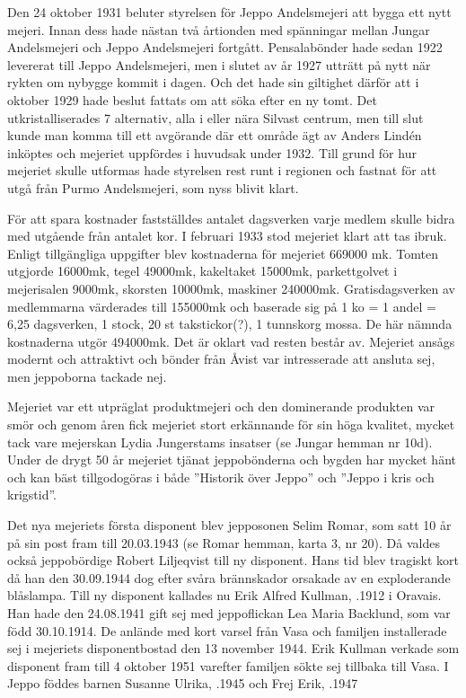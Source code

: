 
Den 24 oktober 1931 beluter styrelsen för Jeppo Andelsmejeri att bygga ett nytt mejeri. Innan dess hade nästan två årtionden med spänningar mellan Jungar Andelsmejeri och Jeppo Andelsmejeri fortgått. Pensalabönder hade sedan 1922 levererat till Jeppo Andelsmejeri, men i slutet av år 1927 utträtt på nytt när rykten om nybygge kommit i dagen. Och det hade sin giltighet därför att i oktober 1929 hade beslut fattats om att söka efter en ny tomt. Det utkristalliserades 7 alternativ, alla i eller nära Silvast centrum, men till slut kunde man komma till ett avgörande där ett område ägt av Anders Lindén inköptes och mejeriet uppfördes i huvudsak under 1932. Till grund för hur mejeriet skulle utformas hade styrelsen rest runt i regionen och fastnat för att utgå från Purmo Andelsmejeri, som nyss blivit klart.


För att spara kostnader fastställdes antalet dagsverken varje medlem skulle bidra med utgående från antalet kor. I februari 1933 stod mejeriet klart att tas ibruk. Enligt tillgängliga uppgifter blev kostnaderna för mejeriet 669000 mk. Tomten utgjorde 16000mk, tegel 49000mk, kakeltaket 15000mk, parkettgolvet i mejerisalen 9000mk, skorsten 10000mk, maskiner 240000mk. Gratisdagsverken av medlemmarna värderades till 155000mk och baserade sig på 1 ko = 1 andel = 6,25 dagsverken, 1 stock, 20 st takstickor(?), 1 tunnskorg mossa. De här nämnda kostnaderna utgör 494000mk. Det är oklart vad resten består av. Mejeriet ansågs modernt och attraktivt och bönder från Åvist var intresserade att ansluta sej, men jeppoborna tackade nej.

Mejeriet var ett utpräglat produktmejeri och den dominerande produkten var smör och genom åren fick mejeriet stort erkännande för sin höga kvalitet, mycket tack vare mejerskan Lydia Jungerstams insatser (se Jungar hemman nr 10d). Under de drygt 50 år mejeriet tjänat jeppobönderna och bygden har mycket hänt och kan bäst tillgodogöras i både ”Historik över Jeppo” och ”Jeppo i kris och krigstid”.

Det nya mejeriets första disponent blev jepposonen Selim Romar, som satt 10 år på sin post fram till 20.03.1943 (se Romar hemman, karta 3, nr 20). Då valdes också jeppobördige Robert Liljeqvist till ny disponent. Hans tid blev tragiskt kort då han den 30.09.1944 dog efter svåra brännskador orsakade av en exploderande blåslampa. Till ny disponent kallades nu Erik Alfred Kullman, .1912 i Oravais. Han hade  den 24.08.1941 gift sej med jeppoflickan Lea Maria Backlund, som var född 30.10.1914. De anlände med kort varsel från Vasa och familjen installerade sej i mejeriets disponentbostad den 13 november 1944. Erik Kullman verkade som disponent fram till 4 oktober 1951 varefter familjen sökte sej tillbaka till Vasa.
I Jeppo föddes barnen Susanne Ulrika, .1945 och Frej Erik, .1947

